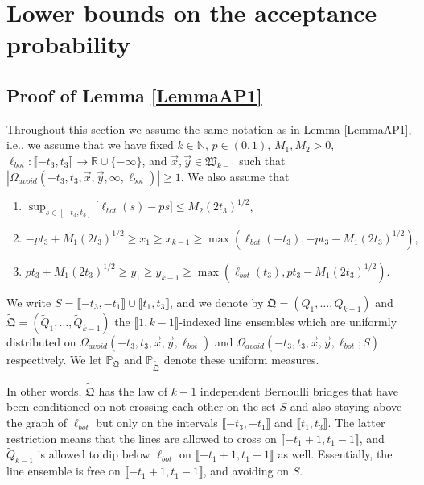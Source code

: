 %
\section{Lower bounds on the acceptance probability}\label{Section6}

\subsection{Proof of Lemma \ref{LemmaAP1}}\label{sect61} Throughout this section we assume the same notation as in Lemma \ref{LemmaAP1}, i.e., we assume that we have fixed $k \in \mathbb{N}$, $p \in (0,1)$, $M_1, M_2 > 0$, $\ell_{bot}: \llbracket -t_3, t_3 \rrbracket \rightarrow \mathbb{R} \cup \{ - \infty \}$, and $\vec{x}, \vec{y} \in \mathfrak{W}_{k-1}$ such that $|\Omega_{avoid}(-t_3, t_3, \vec{x}, \vec{y}, \infty, \ell_{bot})| \geq 1$. We also assume that
\begin{enumerate}
	\item $\sup_{s \in [- t_3,t_3]}\big[\ell_{bot}(s)  - ps \big]  \leq M_2 (2t_3)^{1/2}$,
	\item  $-pt_3 + M_1 (2t_3)^{1/2} \geq  x_1 \geq  x_{k-1} \geq \max\left(\ell_{bot}(-t_3), -pt_3 - M_1 (2t_3)^{1/2}\right),$
	\item $pt_3 + M_1 (2t_3)^{1/2} \geq y_1 \geq y_{k-1} \geq  \max \left( \ell_{bot}(t_3),  p t_3 - M_1(2t_3)^{1/2} \right).$
\end{enumerate}

\begin{definition}\label{TildeDef}
	We write $S = \llbracket -t_3,-t_1\rrbracket\cup \llbracket t_1,t_3\rrbracket$, and we denote by $\mathfrak{Q} = (Q_1,\dots,Q_{k-1})$ and $\tilde{\mathfrak{Q}} = (\tilde{Q}_1, \dots, \tilde{Q}_{k-1})$ the $\llbracket 1, k-1 \rrbracket$-indexed line ensembles which are uniformly distributed on $\Omega_{avoid}(-t_3,t_3,\vec{x},\vec{y},\ell_{bot})$ and $\Omega_{avoid}(-t_3, t_3, \vec{x}, \vec{y}, \ell_{bot};S)$ respectively. We let $\mathbb{P}_{\mathfrak{Q}}$ and $\mathbb{P}_{\tilde{\mathfrak{Q}}}$ denote these uniform measures.
\end{definition}
In other words, $\tilde{\mathfrak{Q}}$ has the law of $k-1$ independent Bernoulli bridges that have been conditioned on not-crossing each other on the set $S$ and also staying above the graph of $\ell_{bot}$ but only on the intervals $\llbracket-t_3, -t_1\rrbracket$ and $\llbracket t_1, t_3\rrbracket$. The latter restriction means that the lines are allowed to cross on $\llbracket -t_1+1,t_1-1\rrbracket$, and  $\tilde{Q}_{k-1}$ is allowed to dip below $\ell_{bot}$ on $\llbracket -t_1+1,t_1-1\rrbracket$ as well. Essentially, the line ensemble is free on $\llbracket -t_1+1,t_1-1\rrbracket$, and avoiding on $S$.

